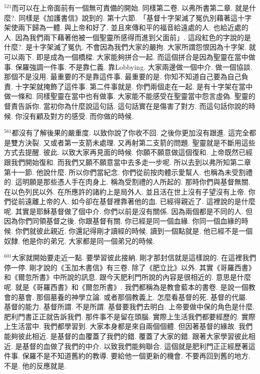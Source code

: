 \documentclass{book}
\begin{document}
$^{521}$而可以在上帝面前有一個無可責備的開始.
同樣第二卷.
以弗所書第二章.
就是什麼?.
同樣是《加護書信》說到的.
第十六節.
「基督十字架滅了冤仇別藉著這十字架使兩下歸為一體.
與上帝和好了.
並且來傳和平的福音給遠處的人.
也給近處的人.
因為我們兩下藉著他被一個聖靈所感得而進到父面前」.
這段紅色的字說的是什麼?.
是十字架滅了冤仇.
不會因為我們大家的嚴拘.
大家所謂怨恨因為十字架.
就可以兩下.
即是成為一個橋樑.
大家能夠拼合一起.
而這個拼合是因為聖靈在當中做事.
保羅強調一件事.
不是靠仁義.
靠Lobbying.
大家兩邊做一個中介.
做一個協談.
那個不是沒用.
最重要的不是靠這件事.
最重要的是.
你知不知道自己要為自己負責.
十字架就掩飾了這件事.
第二件事就是.
你們兩個走在一起.
是有十字架在當中做一條和.
同樣聖靈在當中也有做事.
大家能不能感受在聖靈當中怨言虛偽.
聖靈的督責告訴你.
當初你為什麼說這句話.
這句話實在是傷害了對方.
而這句話你說的時候.
你沒有顧及對方的感受.
而你做的時候.

$^{561}$都沒有了解後果的嚴重度.
以致你說了你收不回.
之後你更加沒有跟進.
這完全都是雙方決裂.
又或者第一支箭未處理.
又再射第二支箭的問題.
聖靈就是不斷用這些方式去提醒.
彼此.
以致大家再見面的時候.
你願不願意做這個復和.
上帝既然已經跟我們開始復和.
而我們又願不願意當中去多走一步呢.
所以去到以弗所知第二章第十一節.
他說什麼.
所以你們當紀念.
你們從前按肉體示愛幫人.
也稱為未受割禮的.
這明願是那些憑人手在肉身上.
稱為受割禮的人所起的.
那時你們與基督無關.
在以色列民以外.
在所應許的諸約上是局外人.
並且活在世上沒有子望沒有上帝.
你們從前遠離上帝的人.
如今卻在基督裡靠著他的血.
已經得親近了.
這裡說的是什麼呢.
其實是耶穌基督做了個中介.
你們以前是沒有關係.
因為兩個都是不同的人.
但因為你們同領基督之後.
你跟基督有關.
你已經是同一個血緣.
你同一個血緣的時候.
你們就彼此親近.
你還記得剛才讀經的時候.
讀到一個點就是.
他已經不是一個奴隸.
他是你的弟兄.
大家都是同一個弟兄的時候.

$^{601}$大家就開始要走近一點.
要學習彼此接納.
剛才那封信就是這樣說的.
在這裡我們停一停.
剛才說的《玉加木書信》有三卷.
除了《肥立比》以外.
其實《哥羅西書》和《爾忽所書》中所說的訊息.
跟今天肥利門所說的內容是很相近的.
意思是什麼呢.
就是《哥羅西書》和《爾忽所書》.
我們都稱為是教會藍本的書卷.
是說一個教會的墓會.
那個墓養的神學立論.
或者那個教義上.
怎麼看基督的死.
基督的代屬.
基督的能力.
基督所謂.
不是所謂.
基督要我們去明白.
上帝要做中保的角色是什麼.
肥利門書正正就告訴我們.
那件事不是留在頭腦.
實際上生活我們都要經歷的.
實際上生活當中.
我們都學習到.
大家本身都是來自兩個個體.
但因著基督的緣故.
我們能夠彼此相近.
是基督的血覆蓋了我們的錯.
覆蓋了大家的錯.
跟著大家學習彼此相近.
是基督的血做了我們的中介.
以致我們能夠聯合.
這個就是肥利門正正經歷著這件事.
保羅不是不知道舊約的教導.
要給他一個更新的機會.
不要再回到舊的地方.
不是.
他的反應就是.
\end{document}
